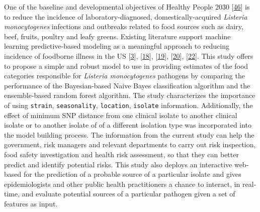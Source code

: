 \documentclass[
  10pt,
]{article}
\begin{document}
One of the baseline and developmental objectives of Healthy People 2030 {[}\protect\hyperlink{ref-Healthypeople2030}{46}{]} is to reduce the incidence of laboratory-diagnosed, domestically-acquired \emph{Listeria monocytogenes} infections and outbreaks related to food sources such as dairy, beef, fruits, poultry and leafy greens. Existing literature support machine learning predictive-based modeling as a meaningful approach to reducing incidence of foodborne illness in the US {[}\protect\hyperlink{ref-tanui2022machine}{3}{]}, {[}\protect\hyperlink{ref-Munck2020}{18}{]}, {[}\protect\hyperlink{ref-Njage2019}{19}{]}, {[}\protect\hyperlink{ref-lupolova2017patchy}{20}{]}, {[}\protect\hyperlink{ref-liu2021machine}{22}{]}. This study offers to propose a simple and robust model to use in providing estimates of the food categories responsible for \emph{Listeria monocytogenes} pathogens by comparing the performance of the Bayesian-based Naive Bayes classification algorithm and the ensemble-based random forest algorithm. The study characterizes the importance of using \texttt{strain}, \texttt{seasonality}, \texttt{location}, \texttt{isolate} information. Additionally, the effect of minimum SNP distance from one clinical isolate to another clinical isolate or to another isolate of of a different isolation type was incorporated into the model building process. The information from the current study can help the government, risk managers and relevant departments to carry out risk inspection, food safety investigation and health risk assessment, so that they can better predict and identify potential risks. This study also deploys an interactive web-based for the prediction of a probable source of a particular isolate and gives epidemiologists and other public health practitioners a chance to interact, in real-time, and evaluate potential sources of a particular pathogen given a set of features as input.
\end{document}
